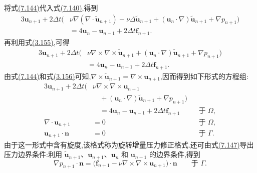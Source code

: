 \begin{note}[旋转增量压力修正格式]
\label{note:rotational-incremental-pressure-correction-properties}
将式\hyperref[eq:rotational-incremental-pressure-correction]{(7.144)}代入式\hyperref[eq:incremental-pressure-correction-bdf2-velocity]{(7.140)},得到
\[
\begin{aligned}
 3\bm{u}_{n+1}+2\Delta t\bigl(&\nu\nabla(\nabla\cdot\widetilde{\bm{u}}_{n+1})
 -\nu\Delta\widetilde{\bm{u}}_{n+1}
 +(\bm{u}_n\cdot\nabla)\widetilde{\bm{u}}_{n+1}
 +\nabla p_{n+1}\bigr)\\
 &=4\bm{u}_n-\bm{u}_{n-1}+2\Delta t\bm{f}_{n+1}.
\end{aligned}
\]
再利用式\hyperref[eq:curl-curl-3d]{(3.155)},可得
\[
\begin{aligned}
 3\bm{u}_{n+1}+2\Delta t\bigl(&\nu\nabla\times\nabla\times\widetilde{\bm{u}}_{n+1}
 +(\bm{u}_n\cdot\nabla)\widetilde{\bm{u}}_{n+1}
 +\nabla p_{n+1}\bigr)\\
 &=4\bm{u}_n-\bm{u}_{n-1}+2\Delta t\bm{f}_{n+1}.
\end{aligned}
\]
由式\hyperref[eq:rotational-incremental-pressure-correction]{(7.144)}和式\hyperref[eq:curl-gradient-zero]{(3.156)}可知,$\nabla\times\widetilde{\bm{u}}_{n+1}=\nabla\times\bm{u}_{n+1}$,因而得到如下形式的方程组:
\begin{equation}\label{eq:rotational-incremental-pressure-correction-balance}
\begin{aligned}
  3\bm{u}_{n+1}+2\Delta t\bigl(&\nu\nabla\times\nabla\times\bm{u}_{n+1}\\
   &\quad +(\bm{u}_n\cdot\nabla)\widetilde{\bm{u}}_{n+1}
         +\nabla p_{n+1}\bigr)\\
   &\quad=4\bm{u}_n-\bm{u}_{n-1}
         +2\Delta t\bm{f}_{n+1}
   &&\text{于 }\Omega,\\
 \nabla\cdot\bm{u}_{n+1}&=0
   &&\text{于 }\Omega,\\
 \bm{u}_{n+1}\cdot\bm{n}&=0
   &&\text{于 }\Gamma.
\end{aligned}
\end{equation}
由于这一形式中含有旋度,该格式称为旋转增量压力修正格式.还可由式\hyperref[eq:rotational-incremental-pressure-correction-balance]{(7.147)}导出压力边界条件:利用 $\widetilde{\bm{u}}_{n+1}$、$\bm{u}_{n+1}$、$\bm{u}_n$ 和 $\bm{u}_{n-1}$ 的边界条件,得到
\begin{equation}\label{eq:rotational-pressure-boundary-condition}
 \nabla p_{n+1}\cdot\bm{n}
  =\bigl(\bm{f}_{n+1}
    -\nu\nabla\times\nabla\times\bm{u}_{n+1}\bigr)
    \cdot\bm{n}
      \qquad\text{于 }\Gamma.
\end{equation}


\end{note}
